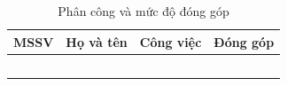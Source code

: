 \begin{table}[H]
\centering
\caption{Phân công và mức độ đóng góp}\label{tab:dong-gop}
\small
\renewcommand{\arraystretch}{1.3}
\begin{tabularx}{\linewidth}{|c|l|L|c|}
\hline
\textbf{MSSV} & \textbf{Họ và tên} & \textbf{Công việc} & \textbf{Đóng góp} \\ \hline
 & & & \\ \hline
 & & & \\ \hline
 & & & \\ \hline
 & & & \\ \hline
 & & & \\ \hline
\end{tabularx}
\end{table}

